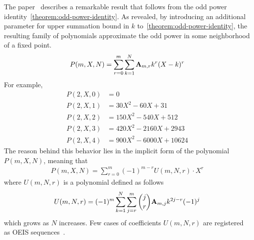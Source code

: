 The paper~\cite{kolosov2025efficient} describes a remarkable result that follows
from the odd power identity~\eqref{theorem:odd-power-identity}.
As revealed, by introducing an additional parameter for upper summation bound in $k$
to~\eqref{theorem:odd-power-identity}, the resulting family of polynomials
approximate the odd power in some neighborhood of a fixed point.
\begin{align*}
    P(m,X,N) = \sum_{r=0}^{m} \sum_{k=1}^{N} {\mathbf{A}} \sb{m,r} k^r (X-k)^r
\end{align*}
For example,
\begin{align*}
    P(2,X,0) &= 0 \\
    P(2,X,1) &= 30X^2 - 60X + 31 \\
    P(2,X,2) &= 150X^2 - 540X + 512 \\
    P(2,X,3) &= 420X^2 - 2160X + 2943 \\
    P(2,X,4) &= 900X^2 - 6000X + 10624
\end{align*}
The reason behind this behavior lies in the implicit form of the polynomial $P(m,X,N)$,
meaning that
\begin{align*}
    P(m,X,N) = \sum_{r=0}^{m} (-1)^{m-r} U(m, N, r) \cdot X^{r}
\end{align*}
where $U(m, N, r)$ is a polynomial defined as follows
\begin{align*}
    U(m, N, r) = (-1)^m \sum_{k=1}^{N} \sum_{j=r}^{m} \binom{j}{r} {\mathbf{A}} \sb{m,j} k^{2j-r} (-1)^j
\end{align*}
which grows as $N$ increases.
Few cases of coefficients $U(m, N, r)$ are registered as OEIS sequences~\cite{
    oeis_coefficients_u_m_l_k_defined_by_polynomial_identity_1,
    oeis_coefficients_u_m_l_k_defined_by_polynomial_identity_2,
    oeis_coefficients_u_m_l_k_defined_by_polynomial_identity_3}.


